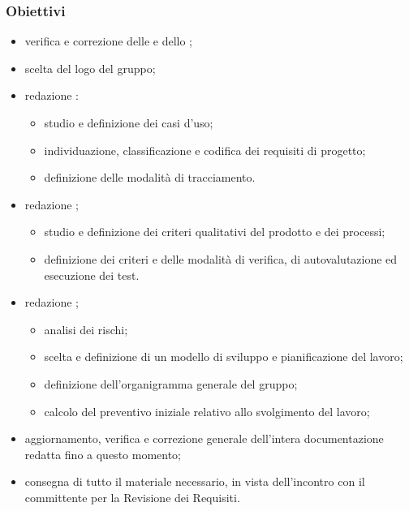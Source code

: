         \subsubsection{Obiettivi}
            \begin{itemize}
                \item verifica e correzione delle \NdP{} e dello \SdF{};
                \item scelta del logo del gruppo;
                \item redazione \AdR{}:
                \begin{itemize}
                    \item studio e definizione dei casi d'uso;
                    \item individuazione, classificazione e codifica dei requisiti di progetto;
                    \item definizione delle modalità di tracciamento.
                \end{itemize}
                \item redazione \PdQ{};
                \begin{itemize}
                    \item studio e definizione dei criteri qualitativi del prodotto e dei processi;
                    \item definizione dei criteri e delle modalità di verifica, di autovalutazione ed esecuzione dei test.
                \end{itemize}
                \item redazione \PdP{};
                \begin{itemize}
                    \item analisi dei rischi;
                    \item scelta e definizione di un modello di sviluppo e pianificazione del lavoro;
                    \item definizione dell'organigramma generale del gruppo;
                    \item calcolo del preventivo iniziale relativo allo svolgimento del lavoro;
                \end{itemize}
                \item aggiornamento, verifica e correzione generale dell'intera documentazione redatta fino a questo momento;
                \item consegna di tutto il materiale necessario, in vista dell'incontro con il committente per la Revisione dei Requisiti.
            \end{itemize}